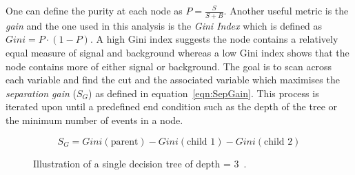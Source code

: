 One can define the purity at each node as $P=\frac{S}{S+B}$. Another useful metric is the \emph{gain} and the one used in this analysis is the \emph{Gini Index} which is defined as $Gini = P\cdot\left(1-P\right)$. A high Gini index suggests the node contains a relatively equal measure of signal and background whereas a low Gini index shows that the node contains more of either signal or background. 
The goal is to scan across each variable and find the cut and the associated variable which maximises the \emph{separation gain} ($S_{G}$) as defined in equation~\ref{eqn:SepGain}. This process is iterated upon until a predefined end condition such as the depth of the tree or the minimum number of events in a node.




\begin{equation}
S_{G} = Gini(\textrm{parent}) - Gini(\textrm{child 1}) - Gini(\textrm{child 2})
\label{eqn:SepGain}
\end{equation}

\begin{figure}[h!]
\begin{center}
\hspace{0.2cm}
\end{center}
\caption{Illustration of a single decision tree of depth = 3~\cite{2007physics3039H}.}
\label{fig:alphaSuncorrected}
\end{figure} 

